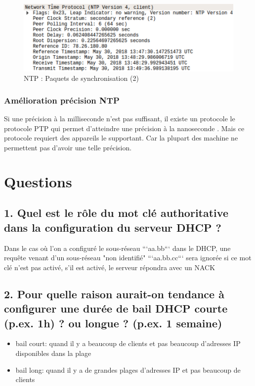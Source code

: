 \documentclass{article}
\begin{document}
\begin{figure}[h]
	\centering
	\includegraphics{./captures/ntp-capture2.png}
	\caption{NTP : Paquets de synchronisation (2)}
	\label{fig:NTP : Paquets de synchronisation (2)}
\end{figure}

\subsubsection{Amélioration précision NTP} 

Si une précision à la milliseconde n'est pas suffisant, il existe un protocole le protocole PTP qui permet d'atteindre une précision à la nanoseconde \cite{PTP}. Mais ce protocole requiert des appareils le supportant. Car la plupart des machine ne permettent pas d'avoir une telle précision.


\clearpage

\section{Questions}

\subsection*{1. Quel est le rôle du mot clé authoritative dans la configuration du serveur DHCP ?}
Dans le cas où l'on a configuré le sous-réseau ```aa.bb``` dans le DHCP, une requête venant d'un sous-réseau "non identifié" ```aa.bb.cc``` sera ignorée si ce mot clé n'est pas activé, s'il est activé, le serveur répondra avec un NACK

\subsection*{2. Pour quelle raison aurait-on tendance à configurer une durée de bail DHCP courte (p.ex. 1h) ? ou longue ? (p.ex. 1 semaine)}
\begin{itemize}
\item bail court: quand il y a beaucoup de clients et pas beaucoup d'adresses IP disponibles dans la plage
\item bail long: quand il y a de grandes plages d'adresses IP et pas beaucoup de clients
\end{itemize}
\end{document}
